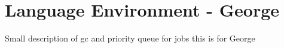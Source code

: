 \section{Language Environment - George}
\label{sect:tech}
Small description of gc and priority queue for jobs
this is for George
